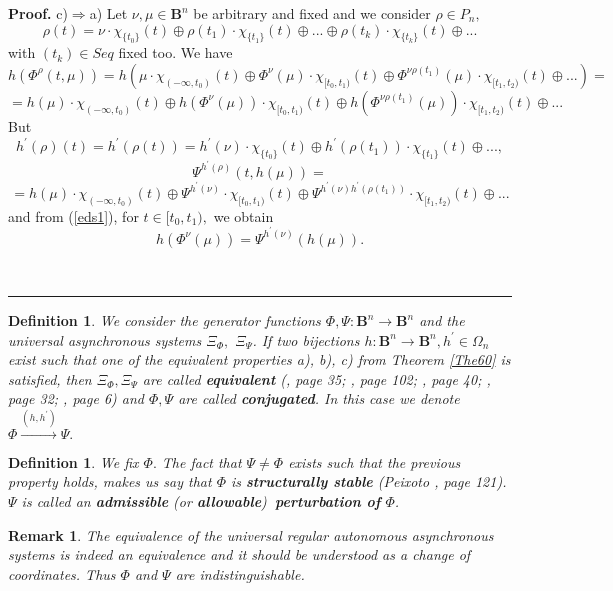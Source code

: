 \documentclass[12pt]{article}\usepackage{amsmath}
\newtheorem{definition}[theorem]{Definition}
\newtheorem{remark}[theorem]{Remark}
\newenvironment{proof}[1][Proof]{\textbf{#1.} }{\ \rule{0.5em}{0.5em}}
\begin{document}
\begin{proof}
c)$\Longrightarrow$a) Let $\nu,\mu\in\mathbf{B}^{n}$ be arbitrary and fixed
and we consider $\rho\in P_{n},$\[
\rho(t)=\nu\cdot\chi_{\{t_{0}\}}(t)\oplus\rho(t_{1})\cdot\chi_{\{t_{1}\}}(t)\oplus...\oplus\rho(t_{k})\cdot\chi_{\{t_{k}\}}(t)\oplus...
\]
with $(t_{k})\in Seq$ fixed too. We have\[
h(\Phi^{\rho}(t,\mu))=h(\mu\cdot\chi_{(-\infty,t_{0})}(t)\oplus\Phi^{\nu}(\mu)\cdot\chi_{\lbrack t_{0},t_{1})}(t)\oplus\Phi^{\nu\rho(t_{1})}(\mu
)\cdot\chi_{\lbrack t_{1},t_{2})}(t)\oplus...)=
\]\[
=h(\mu)\cdot\chi_{(-\infty,t_{0})}(t)\oplus h(\Phi^{\nu}(\mu))\cdot
\chi_{\lbrack t_{0},t_{1})}(t)\oplus h(\Phi^{\nu\rho(t_{1})}(\mu))\cdot
\chi_{\lbrack t_{1},t_{2})}(t)\oplus...
\]
But\[
h^{\prime}(\rho)(t)=h^{\prime}(\rho(t))=h^{\prime}(\nu)\cdot\chi_{\{t_{0}\}}(t)\oplus h^{\prime}(\rho(t_{1}))\cdot\chi_{\{t_{1}\}}(t)\oplus...,
\]\[
\Psi^{h^{\prime}(\rho)}(t,h(\mu))=
\]\[
=h(\mu)\cdot\chi_{(-\infty,t_{0})}(t)\oplus\Psi^{h^{\prime}(\nu)}\cdot
\chi_{\lbrack t_{0},t_{1})}(t)\oplus\Psi^{h^{\prime}(\nu)h^{\prime}(\rho
(t_{1}))}\cdot\chi_{\lbrack t_{1},t_{2})}(t)\oplus...
\]
and from (\ref{eds1}), for $t\in\lbrack t_{0},t_{1}),$ we obtain\[
h(\Phi^{\nu}(\mu))=\Psi^{h^{\prime}(\nu)}(h(\mu)).
\]

\end{proof}

\begin{definition}
\label{Def160}We consider the generator functions $\Phi,\Psi:\mathbf{B}^{n}\rightarrow\mathbf{B}^{n}$ and the universal asynchronous systems
$\Xi_{\Phi},$ $\Xi_{\Psi}$. If two bijections $h:\mathbf{B}^{n}\rightarrow
\mathbf{B}^{n},h^{\prime}\in\Omega_{n}$ exist such that one of the equivalent
properties a), b), c) from Theorem \ref{The60} is satisfied, then $\Xi_{\Phi
},\Xi_{\Psi}$ are called \textbf{equivalent} (\cite{bib4}, page 35;
\cite{bib6}, page 102; \cite{bib1}, page 40; \cite{bib2}, page 32;
\cite{bib5}, page 6) and $\Phi,\Psi$ are called \textbf{conjugated}. In this
case we denote $\Phi\overset{(h,h^{\prime})}{\rightarrow}\Psi.$
\end{definition}

\begin{definition}
\label{Def161}We fix $\Phi.$ The fact that $\Psi\neq\Phi$ exists such that the
previous property holds, makes us say that $\Phi$ is \textbf{structurally
stable} (Peixoto \cite{bib6}, page 121). $\Psi$ is called an
\textbf{admissible} (or \textbf{allowable})\textbf{\ perturbation of} $\Phi$.
\end{definition}

\begin{remark}
The equivalence of the universal regular autonomous asynchronous systems is
indeed an equivalence and it should be understood as a change of coordinates.
Thus $\Phi$ and $\Psi$ are indistinguishable.
\end{remark}
\end{document}
